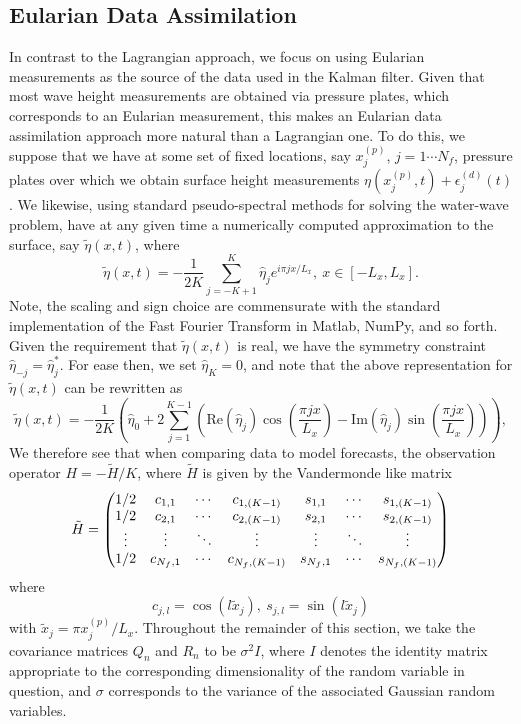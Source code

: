 \subsection*{Eularian Data Assimilation}
In contrast to the Lagrangian approach, we focus on using Eularian measurements as the source of the data used in the Kalman filter.  Given that most wave height measurements are obtained via pressure plates, which corresponds to an Eularian measurement, this makes an Eularian data assimilation approach more natural than a Lagrangian one.  To do this, we suppose that we have at some set of fixed locations, say $x^{(p)}_{j}$, $j=1\cdots N_{f}$, pressure plates over which we obtain surface height measurements $\eta(x^{(p)}_{j},t)+\epsilon^{(d)}_{j}(t)$.  We likewise, using standard pseudo-spectral methods for solving the water-wave problem, have at any given time a numerically computed approximation to the surface, say $\tilde{\eta}(x,t)$, where 
\[
\tilde{\eta}(x,t) = -\frac{1}{2K}\sum_{j=-K+1}^{K}\hat{\eta}_{j}e^{i\pi jx/L_{x}}, ~ x \in [-L_{x},L_{x}].
\]
Note, the scaling and sign choice are commensurate with the standard implementation of the Fast Fourier Transform in Matlab, NumPy, and so forth.  Given the requirement that $\tilde{\eta}(x,t)$ is real, we have the symmetry constraint $\hat{\eta}_{-j} = \hat{\eta}^{\ast}_{j}$.  For ease then, we set $\hat{\eta}_{K}=0$, and note that the above representation for $\tilde{\eta}(x,t)$ can be rewritten as 
\[
\tilde{\eta}(x,t) = -\frac{1}{2K}\left(\hat{\eta}_{0} + 2\sum_{j=1}^{K-1} \left( \mbox{Re}(\hat{\eta}_{j})\cos\left(\frac{\pi j x}{L_{x}}\right) -  \mbox{Im}(\hat{\eta}_{j})\sin\left(\frac{\pi j x}{L_{x}}\right)\right) \right), 
\]
We therefore see that when comparing data to model forecasts, the observation operator $H=-\tilde{H}/K$, where $\tilde{H}$ is given by the Vandermonde like matrix
\[
\tilde{H} =
\begin{pmatrix} 
1/2 & c_{1,1}  & \cdots & c_{1,(K-1)} & s_{1,1} & \cdots &  s_{1,(K-1)} \\  
1/2 & c_{2,1}  & \cdots & c_{2,(K-1)} & s_{2,1} & \cdots &  s_{2,(K-1)} \\
\vdots & \vdots & \ddots & \vdots & \vdots & \ddots & \vdots \\ 
1/2 & c_{N_{f},1}  & \cdots & c_{N_{f},(K-1)} & s_{N_{f},1} & \cdots &  s_{N_{f},(K-1)}
\end{pmatrix} 
\]
where
\[
c_{j,l} = \cos(l\tilde{x}_{j}), ~ s_{j,l} = \sin(l\tilde{x}_{j})
\]
with $\tilde{x}_{j} = \pi x^{(p)}_{j}/L_{x}$.  Throughout the remainder of this section, we take the covariance matrices $Q_{n}$ and $R_{n}$ to be $\sigma^{2}I$, where $I$ denotes the identity matrix appropriate to the corresponding dimensionality of the random variable in question, and $\sigma$ corresponds to the variance of the associated Gaussian random variables.  

